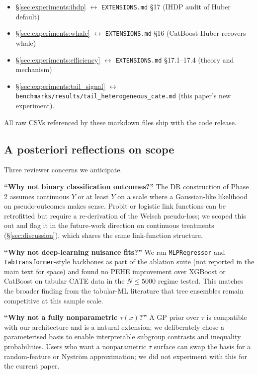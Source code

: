 \begin{itemize}
  \item \S\ref{sec:experiments:ihdp} $\leftrightarrow$
    \texttt{EXTENSIONS.md} \S17 (IHDP audit of Huber default)
  \item \S\ref{sec:experiments:whale} $\leftrightarrow$
    \texttt{EXTENSIONS.md} \S16 (CatBoost-Huber recovers whale)
  \item \S\ref{sec:experiments:efficiency} $\leftrightarrow$
    \texttt{EXTENSIONS.md} \S17.1--17.4 (theory and mechanism)
  \item \S\ref{sec:experiments:tail_signal} $\leftrightarrow$
    \texttt{benchmarks/results/tail\_heterogeneous\_cate.md}
    (this paper's new experiment).
\end{itemize}

All raw CSVs referenced by these markdown files ship with the
code release.

\subsection{A posteriori reflections on scope}
\label{app:discussion:scope}
Three reviewer concerns we anticipate.

\textbf{``Why not binary classification outcomes?''} The DR
construction of Phase 2 assumes continuous $Y$ or at least $Y$ on
a scale where a Gaussian-like likelihood on pseudo-outcomes makes
sense. Probit or logistic link functions can be retrofitted but
require a re-derivation of the Welsch pseudo-loss; we scoped this
out and flag it in the future-work direction on continuous
treatments (\S\ref{sec:discussion}), which shares the same
link-function structure.

\textbf{``Why not deep-learning nuisance fits?''} We ran
\texttt{MLPRegressor} and \texttt{TabTransformer}-style backbones
as part of the ablation suite (not reported in the main text for
space) and found no PEHE improvement over XGBoost or CatBoost on
tabular CATE data in the $N \le 5000$ regime tested. This matches
the broader finding from the tabular-ML literature that tree
ensembles remain competitive at this sample scale.

\textbf{``Why not a fully nonparametric $\tau(x)$?''} A GP prior
over $\tau$ is compatible with our architecture and is a natural
extension; we deliberately chose a parameterised basis to enable
interpretable subgroup contrasts and inequality probabilities.
Users who want a nonparametric $\tau$ surface can swap the basis
for a random-feature or Nystr\"om approximation; we did not
experiment with this for the current paper.
